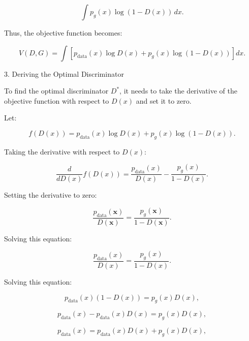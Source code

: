 \begin{equation}
    \int p_g(x) \log (1 - D(x)) \, dx.
\end{equation}

Thus, the objective function becomes:

\begin{equation}
    V(D, G) = \int \left[ p_{\text{data}}(x) \log D(x) + p_g(x) \log (1 - D(x)) \right] dx.
\end{equation}

3. Deriving the Optimal Discriminator

To find the optimal discriminator \( D^* \), it needs to take the derivative of the objective function with respect to \( D(x) \) and set it to zero.

Let:

\begin{equation}
    f(D(x)) = p_{\text{data}}(x) \log D(x) + p_g(x) \log (1 - D(x)).
\end{equation}

Taking the derivative with respect to \( D(x) \):

\begin{equation}
    \frac{d}{dD(x)} f(D(x)) = \frac{p_{\text{data}}(x)}{D(x)} - \frac{p_g(x)}{1 - D(x)}.
\end{equation}

Setting the derivative to zero:

\begin{equation}
    \frac{p_{\text{data}}(\mathbf{x})}{D(\mathbf{x})} = \frac{p_g(\mathbf{x})}{1 - D(\mathbf{x})}.
\end{equation}

Solving this equation:

\begin{equation}
    \frac{p_{\text{data}}(x)}{D(x)} = \frac{p_g(x)}{1 - D(x)}.
\end{equation}

Solving this equation:

\begin{equation}
    p_{\text{data}}(x)(1 - D(x)) = p_g(x)D(x),
\end{equation}

\begin{equation}
    p_{\text{data}}(x) - p_{\text{data}}(x)D(x) = p_g(x)D(x),
\end{equation}

\begin{equation}
    p_{\text{data}}(x) = p_{\text{data}}(x)D(x) + p_g(x)D(x),
\end{equation}

